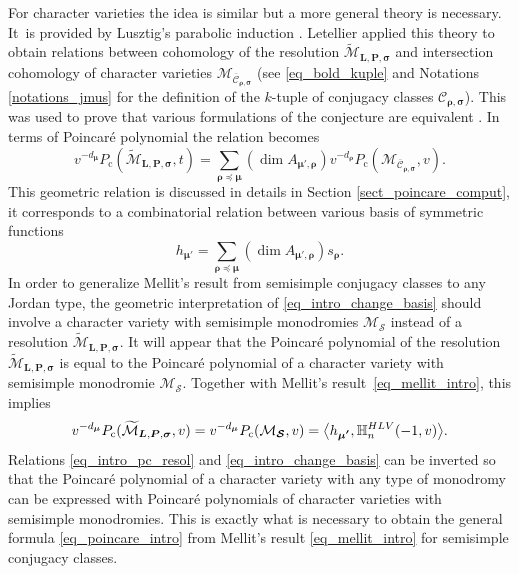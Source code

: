 \documentclass[11pt]{article}
\newcommand{\rc}{\mathrm{c}}
\newcommand{\HLV}{\textup{HLV}}
\newcommand{\blangle}{\bigl\langle}
\newcommand{\brangle}{\bigr\rangle}
\theoremstyle{definition}
\theoremstyle{plain}
\newcommand{\mlps}{\widetilde{\mathcal{M}}_{\boldsymbol{L},\boldsymbol{P},\boldsymbol{\sigma}}}
\begin{document}
For character varieties the idea is similar but a more general theory is necessary. It~is provided by Lusztig's parabolic induction \cite{Lusztig1984,lusztig_character_sheaves,Lusztig1986}. Letellier applied this theory to obtain relations between cohomology of the resolution $\mlps$ and intersection cohomology of character varieties $\mathcal{M}_{\overline{\mathcal{C}}_{\boldsymbol{\rho},\boldsymbol{\sigma}}}$ (see \eqref{eq_bold_kuple} and Notations \ref{notations_jmus} for the definition of the $k$-tuple of conjugacy classes $\mathcal{C}_{\boldsymbol{\rho},\boldsymbol{\sigma}}$). This was used to prove that various formulations of the conjecture are equivalent \cite[Prop.\,5.7]{Letellier_gl}.
In terms of Poincaré polynomial the relation becomes
\begin{equation}\label{eq_intro_pc_resol}
v^{-d_{\boldsymbol{\mu}}} P_{\rc}(\mlps,t) = \sum_{\boldsymbol{\rho\preceq\mu}}(\dim A_{\boldsymbol{\mu',\rho}}) v^{-d_{\boldsymbol{\rho}}} P_{\rc}(\mathcal{M}_{\overline{\mathcal{C}}_{\boldsymbol{\rho},\boldsymbol{\sigma}}}, v).
\end{equation}
This geometric relation is discussed in details in Section \ref{sect_poincare_comput}, it corresponds to a combinatorial relation between various basis of symmetric functions
\begin{equation}\label{eq_intro_change_basis}
h_{\boldsymbol{\mu'}} = \sum_{\boldsymbol{\rho\preceq\mu}} \left(\dim A_{\boldsymbol{\mu',\rho}}\right) s_{\boldsymbol{\rho}}.
\end{equation}
In order to generalize Mellit's result from semisimple conjugacy classes to any Jordan type, the geometric interpretation of \eqref{eq_intro_change_basis} should involve a character variety with semisimple monodromies $\mathcal{M}_{\boldsymbol{\mathcal{S}}}$ instead of a resolution $\mlps$. It will appear that the Poincaré polynomial of the resolution $\mlps$ is equal to the Poincaré polynomial of a character variety with semisimple monodromie $\mathcal{M}_{\boldsymbol{\mathcal{S}}}$. Together with Mellit's result~\eqref{eq_mellit_intro}, this implies
\[
v^{-d_{\boldsymbol{\mu}}} P_{\rc}(\mlps,v) = v^{-d_{\boldsymbol{\mu}}} P_{\rc}(\mathcal{M}_{\boldsymbol{\mathcal{S}}},v) =\blangle h_{\boldsymbol{\mu'}}, \mathbb{H}_n^{\HLV}(-1,v)\brangle.
\]
Relations \eqref{eq_intro_pc_resol} and \eqref{eq_intro_change_basis} can be inverted so that the Poincaré polynomial of a character variety with any type of monodromy can be expressed with Poincaré polynomials of character varieties with semisimple monodromies. This is exactly what is necessary to obtain the general formula \eqref{eq_poincare_intro} from Mellit's result \eqref{eq_mellit_intro} for semisimple conjugacy classes.
\end{document}

